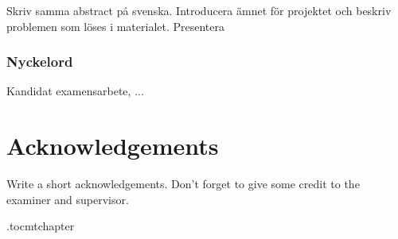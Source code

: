 Skriv samma abstract på svenska. Introducera ämnet för projektet och beskriv problemen som löses i materialet. Presentera

\subsection*{Nyckelord}
Kandidat examensarbete, ...


\newpage
\thispagestyle{plain}
\chapter*{Acknowledgements}
Write a short acknowledgements. Don't forget to give some credit to the examiner and supervisor.

\newpage



\newpage

\etocdepthtag.toc{mtchapter}
\thispagestyle{plain}
\tableofcontents

\newpage


